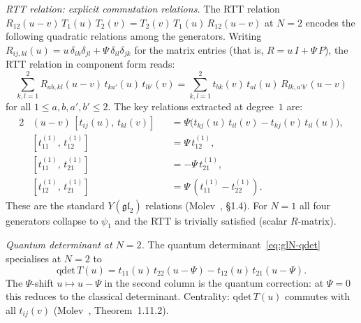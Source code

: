\begin{example}[The $N = 2$ chiral quantum group:
$Y(\widehat{\mathfrak{gl}}_2)$ and Virasoro]
\medskip
\emph{RTT relation: explicit commutation relations.}
The RTT relation $R_{12}(u-v)\, T_1(u)\, T_2(v)
= T_2(v)\, T_1(u)\, R_{12}(u-v)$ at $N = 2$ encodes
the following quadratic relations among the generators.
Writing $R_{ij,kl}(u) = u\,\delta_{ik}\delta_{jl}
+ \Psi\,\delta_{il}\delta_{jk}$
for the matrix entries (that is, $R = u\, I + \Psi\, P$),
the RTT relation in component form
reads:
\begin{equation}\label{eq:gl2-rtt-components}
 \sum_{k,l = 1}^{2}
 R_{ab,kl}(u-v)\, t_{ka'}(u)\, t_{lb'}(v)
 = \sum_{k,l = 1}^{2}
 t_{bk}(v)\, t_{al}(u)\, R_{lk,a'b'}(u-v)
\end{equation}
for all $1 \leq a,b,a',b' \leq 2$.
The key relations extracted at degree~$1$ are:
\begin{alignat}{2}\label{eq:gl2-rtt-degree1}
 &(u - v)\,[t_{ij}(u),\, t_{kl}(v)]
 &&= \Psi\bigl(
 t_{kj}(u)\, t_{il}(v)
 - t_{kj}(v)\, t_{il}(u)
 \bigr), \\
 \label{eq:gl2-rtt-offdiag}
 &[t_{11}^{(1)},\, t_{12}^{(1)}]
 &&= \Psi\, t_{12}^{(1)}, \\
 \label{eq:gl2-rtt-offdiag2}
 &[t_{11}^{(1)},\, t_{21}^{(1)}]
 &&= -\Psi\, t_{21}^{(1)}, \\
 \label{eq:gl2-rtt-cross}
 &[t_{12}^{(1)},\, t_{21}^{(1)}]
 &&= \Psi\,
 (t_{11}^{(1)} - t_{22}^{(1)}).
\end{alignat}
These are the standard $Y(\mathfrak{gl}_2)$
relations (Molev~\cite{Molev07}, \S1.4). For $N = 1$ all
four generators collapse to $\psi_1$ and the RTT is trivially
satisfied (scalar $R$-matrix).

\medskip
\emph{Quantum determinant at $N = 2$.}
The quantum determinant~\eqref{eq:glN-qdet} specialises at
$N = 2$ to
\begin{equation}\label{eq:gl2-qdet}
 \mathrm{qdet}\, T(u)
 = t_{11}(u)\, t_{22}(u - \Psi)
 - t_{12}(u)\, t_{21}(u - \Psi).
\end{equation}
The $\Psi$-shift $u \mapsto u - \Psi$ in the second column
is the quantum correction: at $\Psi = 0$ this reduces to
the classical determinant. Centrality: $\mathrm{qdet}\, T(u)$
commutes with all $t_{ij}(v)$
(Molev~\cite{Molev07}, Theorem~1.11.2).


\end{example}
